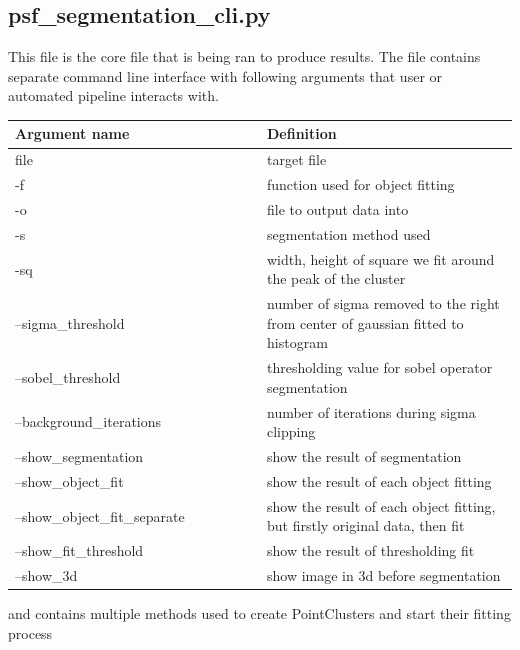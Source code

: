 \documentclass[12pt, a4paper, oneside]{book}
\begin{document}
\subsection{psf\_segmentation\_cli.py}

This file is the core file that is being ran to produce results.
The file contains separate command line interface with following arguments that user or automated pipeline interacts with.

\begin{center}
    \begin{tabular}  { | p{0.5\linewidth} | p{0.5\linewidth} | }
        \hline
        Argument name & Definition \\
        \hline
        file & target file \\
        \hline
        -f & function used for object fitting \\
        \hline
        -o & file to output data into \\
        \hline
        -s & segmentation method used \\
        \hline
        -sq & width, height of square we fit around the peak of the cluster \\
        \hline
        --sigma\_threshold & number of sigma removed to the right from center of gaussian fitted to histogram \\
        \hline
        --sobel\_threshold & thresholding value for sobel operator segmentation \\
        \hline
        --background\_iterations & number of iterations during sigma clipping \\
        \hline
        --show\_segmentation & show the result of segmentation \\
        \hline
        --show\_object\_fit & show the result of each object fitting \\
        \hline
        --show\_object\_fit\_separate & show the result of each object fitting, but firstly original data, then fit \\
        \hline
        --show\_fit\_threshold & show the result of thresholding fit \\
        \hline
        --show\_3d & show image in 3d before segmentation \\
        \hline
    \end{tabular}
\end{center}

and contains multiple methods used to create PointClusters and start their fitting process
\end{document}
